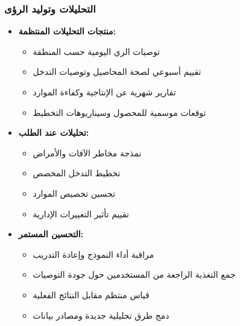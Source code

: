 \subsubsection{التحليلات وتوليد الرؤى}
\begin{itemize}
    \item \textbf{منتجات التحليلات المنتظمة:}
    \begin{itemize}
        \item توصيات الري اليومية حسب المنطقة
        \item تقييم أسبوعي لصحة المحاصيل وتوصيات التدخل
        \item تقارير شهرية عن الإنتاجية وكفاءة الموارد
        \item توقعات موسمية للمحصول وسيناريوهات التخطيط
    \end{itemize}
    
    \item \textbf{تحليلات عند الطلب:}
    \begin{itemize}
        \item نمذجة مخاطر الآفات والأمراض
        \item تخطيط التدخل المخصص
        \item تحسين تخصيص الموارد
        \item تقييم تأثير التغييرات الإدارية
    \end{itemize}
    
    \item \textbf{التحسين المستمر:}
    \begin{itemize}
        \item مراقبة أداء النموذج وإعادة التدريب
        \item جمع التغذية الراجعة من المستخدمين حول جودة التوصيات
        \item قياس منتظم مقابل النتائج الفعلية
        \item دمج طرق تحليلية جديدة ومصادر بيانات
    \end{itemize}
\end{itemize}

